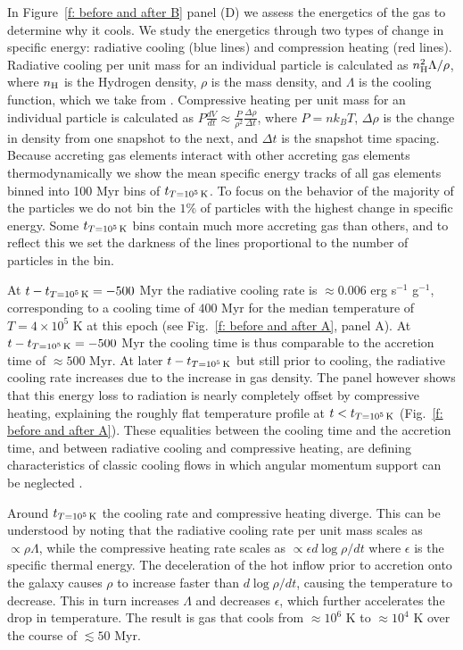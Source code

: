 \documentclass[fleqn,usenatbib]{mnras}
\newcommand{\tcon}{t_{T=10^5\,{\rm K}}}
\newcommand{\nH}{n_{\rm H}}
\begin{document}
In Figure~\ref{f: before and after B} panel (D) we assess the energetics of the gas to determine why it cools.
We study the energetics through two types of change in specific energy: radiative cooling (blue lines) and compression heating (red lines).
Radiative cooling per unit mass for an individual particle is calculated as $\nH^2 \Lambda / \rho$, where $\nH$ is the Hydrogen density, $\rho$ is the mass density, and $\Lambda$ is the cooling function, which we take from \cite{Wiersma2009a}.
Compressive heating per unit mass for an individual particle is calculated as $P \frac{dV}{dt} \approx \frac{ P }{ \rho^2 } \frac{ \Delta \rho }{ \Delta t }$, where $P = n k_B T$, $\Delta \rho$ is the change in density from one snapshot to the next, and $\Delta t$ is the snapshot time spacing.
Because accreting gas elements interact with other accreting gas elements thermodynamically we show the mean specific energy tracks of all gas elements binned into 100 Myr bins of $\tcon$.
To focus on the behavior of the majority of the particles we do not bin the $1\%$ of particles with the highest change in specific energy.
Some $\tcon$ bins contain much more accreting gas than others, and to reflect this we set the darkness of the lines proportional to the number of particles in the bin.

At $t-\tcon=-500$ Myr the radiative cooling rate is $\approx0.006$ erg s$^{-1}$ g$^{-1}$, corresponding to a cooling time of $400$ Myr for the median temperature of $T=4\times 10^5$ K at this epoch (see Fig.~\ref{f: before and after A}, panel A).
At $t-\tcon =-500$ Myr the cooling time is thus comparable to the accretion time of $\approx500$ Myr.
At later $t-\tcon$ but still prior to cooling, the radiative cooling rate increases due to the increase in gas density.
The panel however shows that this energy loss to radiation  is nearly completely offset by compressive heating, explaining the roughly flat temperature profile at $t<\tcon$ (Fig.~\ref{f: before and after A}). 
These equalities between the cooling time and the accretion time, and between radiative cooling and compressive heating, are defining   characteristics of classic cooling flows in which angular momentum support can be neglected \citep{Mathews1978, McNamara2007, Stern2019}. 

Around $\tcon$ the cooling rate and compressive heating diverge.
This can be understood by noting that the radiative cooling rate per unit mass scales as $\propto\rho\Lambda$, while the compressive heating rate scales as $\propto\epsilon d\log\rho/d t$ where $\epsilon$ is the specific thermal energy.
The deceleration of the hot inflow prior to accretion onto the galaxy causes $\rho$ to increase faster than $d\log\rho/d t$, causing the temperature to decrease.
This in turn increases $\Lambda$ and decreases $\epsilon$, which further accelerates the drop in temperature.
The result is gas that cools from $\approx10^6$ K to $\approx10^4$ K over the course of $\lesssim 50$ Myr.
\end{document}
